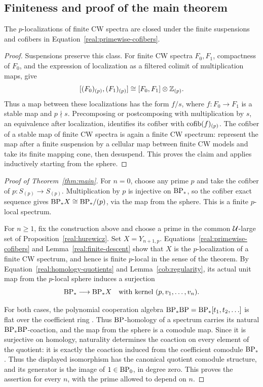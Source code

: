 \subsection{Finiteness and proof of the main theorem}

\begin{lemma}\label{real:finite-descent}
The \(p\)-localizations of finite CW spectra are closed under the
finite suspensions and cofibers in
Equation~\eqref{real:primewise-cofibers}.
\end{lemma}

\begin{proof}
Suspensions preserve this class.  For finite CW spectra \(F_0,F_1\),
compactness of \(F_0\), and the expression of localization as a
filtered colimit of multiplication maps, give
\[
 [ (F_0)_{(p)},(F_1)_{(p)} ]
 \cong [F_0,F_1]\otimes\mathbb Z_{(p)}.
\]
Thus a map between these localizations has the form \(f/s\),
where \(f:F_0\to F_1\) is a stable map and \(p\nmid s\).
Precomposing or postcomposing with multiplication by \(s\), an
equivalence after localization, identifies its cofiber with
\(\operatorname{cofib}(f)_{(p)}\).  The cofiber of a stable map of finite
CW spectra is again a finite CW spectrum: represent the map after
a finite suspension by a cellular map between finite CW models
and take its finite mapping cone, then desuspend.  This proves the
claim and applies inductively starting from the sphere.
\end{proof}

\begin{proof}[Proof of Theorem~\ref{thm:main}]
For \(n=0\), choose any prime \(p\) and take the cofiber of
\(p:S_{(p)}\to S_{(p)}\).  Multiplication by \(p\) is
injective on \(\mathrm{BP}_*\), so the cofiber exact sequence gives
\(\mathrm{BP}_*X\cong\mathrm{BP}_*/(p)\), via the map from the sphere.
This is a finite \(p\)-local spectrum.

For \(n\geq1\), fix the construction above and choose a prime
in the common \(\mathcal U\)-large set of
Proposition~\ref{real:hurewicz}.  Set \(X=Y_{n+1,p}\).
Equations~\eqref{real:primewise-cofibers} and
Lemma~\ref{real:finite-descent} show that \(X\) is the
\(p\)-localization of a finite CW spectrum, and hence is finite
\(p\)-local in the sense of the theorem.  By
Equation~\eqref{real:homology-quotients} and
Lemma~\ref{cob:regularity}, its actual unit map from the
\(p\)-local sphere induces a surjection
\[
 \mathrm{BP}_*\longrightarrow\mathrm{BP}_*X
 \quad\text{with kernel }(p,v_1,\ldots,v_n).
\]

For both cases, the polynomial cooperation algebra
\(\mathrm{BP}_*\mathrm{BP}=\mathrm{BP}_*[t_1,t_2,\ldots]\) is flat over the
coefficient ring \cite[Section~4.4]{HazewinkelIII}. Thus
\(\mathrm{BP}\)-homology of a spectrum carries its natural
\(\mathrm{BP}_*\mathrm{BP}\)-coaction, and the map from the sphere is
a comodule map. Since it is surjective on homology, naturality
determines the coaction on every element of the quotient: it is
exactly the coaction induced from the coefficient comodule
\(\mathrm{BP}_*\).  Thus the displayed isomorphism has the canonical
quotient comodule structure, and its generator is the image of
\(1\in\mathrm{BP}_0\), in degree zero.  This proves the assertion
for every \(n\), with the prime allowed to depend on \(n\).
\end{proof}
